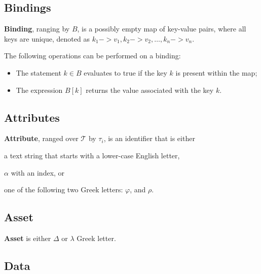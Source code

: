 \subsection{Bindings}

\begin{definition}[Binding]
\textbf{Binding}, ranging by \(B\), is a possibly empty map of key-value pairs, where all keys are unique, denoted as $k_1 -> v_1, k_2 -> v_2, \dots, k_n -> v_n$.
\end{definition}

The following operations can be performed on a binding:
\begin{itemize}
\item The statement \(k \in B\) evaluates to true if the key \(k\) is present within the map;
\item The expression \(B[k]\) returns the value associated with the key \(k\).
\end{itemize}

\subsection{Attributes}

\begin{definition}[Attribute]
\textbf{Attribute}, ranged over \(\mathcal{T}\) by \(\tau_i\), is an identifier that is either
\begin{inparaenum}[1)]
    \item a text string that starts with a lower-case English letter,
    \item \(\alpha\) with an index,
    or
    \item one of the following two Greek letters:
    \(\varphi\),
    and
    \(\rho\).
\end{inparaenum}
\end{definition}

\subsection{Asset}

\begin{definition}[Asset]
\textbf{Asset} is either \(\Delta\) or \(\lambda\) Greek letter.
\end{definition}

\subsection{Data}

